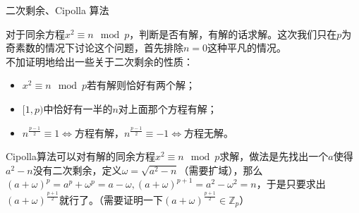 \documentclass{beamer}
\begin{document}
\begin{frame}{二次剩余、Cipolla 算法}
	
	对于同余方程$x^2 \equiv n \mod p$，判断是否有解，有解的话求解。这次我们只在$p$为奇素数的情况下讨论这个问题，首先排除$n=0$这种平凡的情况。\\
	
	不加证明地给出一些关于二次剩余的性质：
	
	\begin{itemize}
		\item $x^2 \equiv n \mod p$若有解则恰好有两个解；
		\item $[1, p)$中恰好有一半的$n$对上面那个方程有解；
		\item $n^{\frac{p-1}{2}} \equiv 1 \Leftrightarrow $方程有解，$n^{\frac{p-1}{2}} \equiv -1 \Leftrightarrow $方程无解。
	\end{itemize}
	
	Cipolla算法可以对有解的同余方程$x^2\equiv n \mod p$求解，做法是先找出一个$a$使得$a^2 - n$没有二次剩余，定义$\omega = \sqrt{a^2-n}$（需要扩域），那么$(a + \omega)^p = a^p + \omega^p = a - \omega, (a + \omega)^{p+1} = a^2-\omega^2 = n$，于是只要求出$(a+\omega)^{\frac{p+1}{2}}$就行了。（需要证明一下$(a+\omega)^{\frac{p+1}{2}} \in \mathbb Z_p$）
	
\end{frame}
\end{document}
